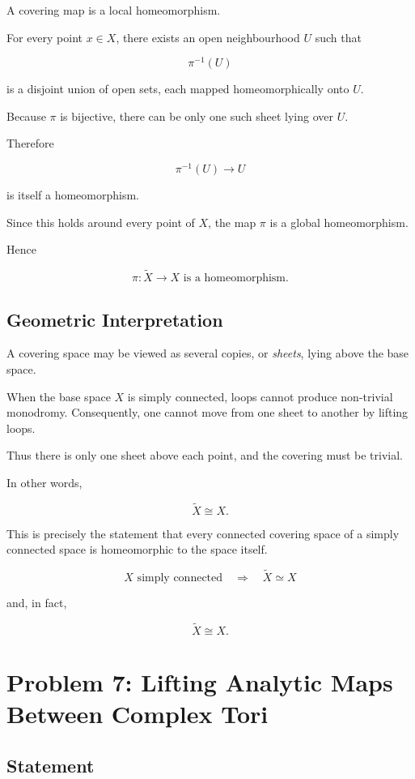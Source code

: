 \documentclass[12pt,a4paper]{article}
\theoremstyle{notespace}
\begin{document}
A covering map is a local homeomorphism.

For every point \(x\in X\), there exists an open neighbourhood \(U\) such that

\[
\pi^{-1}(U)
\]

is a disjoint union of open sets, each mapped homeomorphically onto \(U\).

Because \(\pi\) is bijective, there can be only one such sheet lying over \(U\).

Therefore

\[
\pi^{-1}(U)\to U
\]

is itself a homeomorphism.

Since this holds around every point of \(X\), the map \(\pi\) is a global homeomorphism.

Hence

\[
\boxed{\pi:\widetilde X\to X \text{ is a homeomorphism}.}
\]

\subsection{Geometric Interpretation}

A covering space may be viewed as several copies, or \emph{sheets}, lying above the base space.

When the base space \(X\) is simply connected, loops cannot produce non-trivial monodromy. Consequently, one cannot move from one sheet to another by lifting loops.

Thus there is only one sheet above each point, and the covering must be trivial.

In other words,

\[
\widetilde X\cong X.
\]

This is precisely the statement that every connected covering space of a simply connected space is homeomorphic to the space itself.

\[
\boxed{
	X \text{ simply connected}
	\quad\Longrightarrow\quad
	\widetilde X \simeq X
}
\]

and, in fact,

\[
\boxed{
	\widetilde X \cong X.
}
\]

\section{Problem 7: Lifting Analytic Maps Between Complex Tori}

\subsection{Statement}
\end{document}
